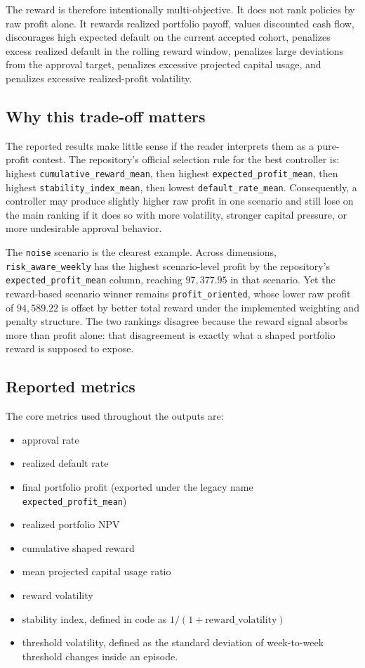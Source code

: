 \documentclass[12pt,a4paper]{article}
\begin{document}
The reward is therefore intentionally multi-objective. It does not rank policies by raw profit alone. It rewards realized portfolio payoff, values discounted cash flow, discourages high expected default on the current accepted cohort, penalizes excess realized default in the rolling reward window, penalizes large deviations from the approval target, penalizes excessive projected capital usage, and penalizes excessive realized-profit volatility.

\subsection{Why this trade-off matters}

The reported results make little sense if the reader interprets them as a pure-profit contest. The repository's official selection rule for the best controller is: highest \texttt{cumulative\_reward\_mean}, then highest \texttt{expected\_profit\_mean}, then highest \texttt{stability\_index\_mean}, then lowest \texttt{default\_rate\_mean}. Consequently, a controller may produce slightly higher raw profit in one scenario and still lose on the main ranking if it does so with more volatility, stronger capital pressure, or more undesirable approval behavior.

The \texttt{noise} scenario is the clearest example. Across dimensions, \texttt{risk\_aware\_weekly} has the highest scenario-level profit by the repository's \texttt{expected\_profit\_mean} column, reaching $97{,}377.95$ in that scenario. Yet the reward-based scenario winner remains \texttt{profit\_oriented}, whose lower raw profit of $94{,}589.22$ is offset by better total reward under the implemented weighting and penalty structure. The two rankings disagree because the reward signal absorbs more than profit alone: that disagreement is exactly what a shaped portfolio reward is supposed to expose.

\subsection{Reported metrics}

The core metrics used throughout the outputs are:
\begin{itemize}[leftmargin=*]
    \item approval rate
    \item realized default rate
    \item final portfolio profit (exported under the legacy name \texttt{expected\_profit\_mean})
    \item realized portfolio NPV
    \item cumulative shaped reward
    \item mean projected capital usage ratio
    \item reward volatility
    \item stability index, defined in code as $1 / (1 + \mathrm{reward\_volatility})$
    \item threshold volatility, defined as the standard deviation of week-to-week threshold changes inside an episode.
\end{itemize}
\end{document}
